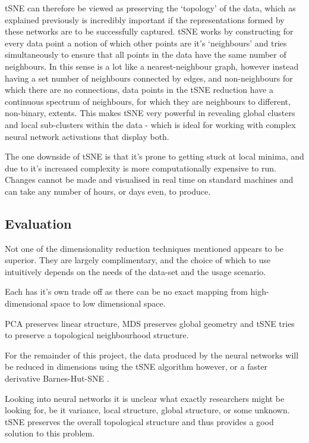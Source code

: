\documentclass[a4paper,11pt,titlepage]{article}
\begin{document}
		tSNE can therefore be viewed as preserving the `topology' of the data, which as explained previously is incredibly important if the representations formed by these networks are to be successfully captured. tSNE works by constructing for every data point a notion of which other points are it's `neighbours' and tries simultaneously to ensure that all points in the data have the same number of neighbours. In this sense is a lot like a nearest-neighbour graph, however instead having a set number of neighbours connected by edges, and non-neighbours for which there are no connections, data points in the tSNE reduction have a continuous spectrum of neighbours, for which they are neighbours to different, non-binary, extents. This makes tSNE very powerful in revealing global clusters and local sub-clusters within the data - which is ideal for working with complex neural network activations that display both.
		\par
		 The one downside of tSNE is that it's prone to getting stuck at local minima, and due to it's increased complexity is more computationally expensive to run. Changes cannot be made and visualised in real time on standard machines and can take any number of hours, or days even, to produce.  
		 
	\subsection{Evaluation}
	Not one of the dimensionality reduction techniques mentioned appears to be superior. They are largely complimentary, and the choice of which to use intuitively depends on the needs of the data-set and the usage scenario. 
	\par 
	Each has it's own trade off as there can be no exact mapping from high-dimensional space to low dimensional space. 
		\par 
		PCA preserves linear structure, MDS preserves global geometry and tSNE tries to preserve a topological neighbourhood structure.
		\par 
		For the remainder of this project, the data produced by the neural networks will be reduced in dimensions using the tSNE algorithm however, or a faster derivative Barnes-Hut-SNE \cite{VanderMaaten2013}.
		\par 
		Looking into neural networks it is unclear what exactly researchers might be looking for, be it variance, local structure, global structure, or some unknown. tSNE preserves the overall topological structure and thus provides a good solution to this problem. 
\clearpage
\end{document}
